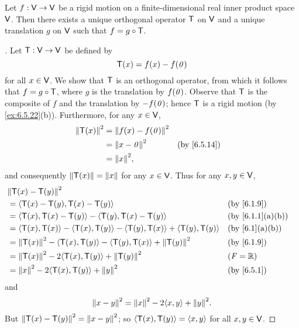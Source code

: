 \begin{thm}\label{6.22}
  Let \(f : \mathsf{V} \to \mathsf{V}\) be a rigid motion on a finite-dimensional real inner product space \(\mathsf{V}\).
  Then there exists a unique orthogonal operator \(\mathsf{T}\) on \(\mathsf{V}\) and a unique translation \(g\) on \(\mathsf{V}\) such that \(f = g \circ \mathsf{T}\).
\end{thm}

\begin{proof}[]
  Let \(\mathsf{T} : \mathsf{V} \to \mathsf{V}\) be defined by
  \[
    \mathsf{T}(x) = f(x) - f(\mathit{0})
  \]
  for all \(x \in \mathsf{V}\).
  We show that \(\mathsf{T}\) is an orthogonal operator, from which it follows that \(f = g \circ \mathsf{T}\), where \(g\) is the translation by \(f(\mathit{0})\).
  Observe that \(\mathsf{T}\) is the composite of \(f\) and the translation by \(-f(\mathit{0})\);
  hence \(\mathsf{T}\) is a rigid motion (by \cref{ex:6.5.22}(b)).
  Furthermore, for any \(x \in \mathsf{V}\),
  \begin{align*}
    \norm{\T(x)}^2 & = \norm{f(x) - f(\zv)}^2                  \\
                   & = \norm{x - \zv}^2       &  & \by{6.5.14} \\
                   & = \norm{x}^2,
  \end{align*}
  and consequently \(\left\lVert\mathsf{T}(x)\right\rVert = \left\lVert x\right\rVert\) for any \(x \in \mathsf{V}\).
  Thus for any \(x, y \in \mathsf{V}\),
  \begin{align*}
     & \norm{\T(x) - \T(y)}^2                                                                                   \\
     & = \inn{\T(x) - \T(y), \T(x) - \T(y)}                                                &  & \by{6.1.9}      \\
     & = \inn{\T(x), \T(x) - \T(y)} - \inn{\T(y), \T(x) - \T(y)}                           &  & \by{6.1.1}[a,b] \\
     & = \inn{\T(x), \T(x)} - \inn{\T(x), \T(y)} - \inn{\T(y), \T(x)} + \inn{\T(y), \T(y)} &  & \by{6.1}[a,b]   \\
     & = \norm{\T(x)}^2 - \inn{\T(x), \T(y)} - \inn{\T(y), \T(x)} + \norm{\T(y)}^2         &  & \by{6.1.9}      \\
     & = \norm{\T(x)}^2 - 2 \inn{\T(x), \T(y)} + \norm{\T(y)}^2                            &  & (\F = \R)       \\
     & = \norm{x}^2 - 2 \inn{\T(x), \T(y)} + \norm{y}^2                                    &  & \by{6.5.1}
  \end{align*}
  and
  \[
    \norm{x - y}^2 = \norm{x}^2 - 2 \inn{x, y} + \norm{y}^2.
  \]
  But \(\left\lVert\mathsf{T}(x) - \mathsf{T}(y)\right\rVert^2 = \left\lVert x - y\right\rVert^2\);
  so \(\left\langle\mathsf{T}(x), \mathsf{T}(y)\right\rangle = \left\langle x, y\right\rangle\) for all \(x, y \in \mathsf{V}\).


\end{proof}
